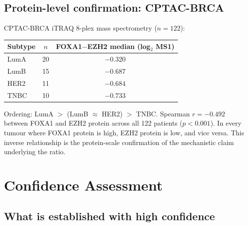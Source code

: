 \documentclass[12pt, a4paper]{article}
\begin{document}
\subsection{Protein-level confirmation: CPTAC-BRCA}

CPTAC-BRCA iTRAQ 8-plex mass spectrometry ($n=122$):

\begin{center}
\begin{tabular}{lcc}
\toprule
\textbf{Subtype} & \textbf{$n$}
& \textbf{FOXA1$-$EZH2 median (log$_2$ MS1)} \\
\midrule
LumA & 20 & $-0.320$ \\
LumB & 15 & $-0.687$ \\
HER2 & 11 & $-0.684$ \\
TNBC & 10 & $-0.733$ \\
\bottomrule
\end{tabular}
\end{center}

\noindent Ordering: LumA $>$ (LumB $\approx$ HER2) $>$ TNBC.
Spearman $r = -0.492$ between FOXA1 and EZH2 protein across
all 122 patients ($p < 0.001$). In every tumour where FOXA1
protein is high, EZH2 protein is low, and vice versa. This
inverse relationship is the protein-scale confirmation of
the mechanistic claim underlying the ratio.

\section{Confidence Assessment}

\subsection{What is established with high confidence}
\end{document}
